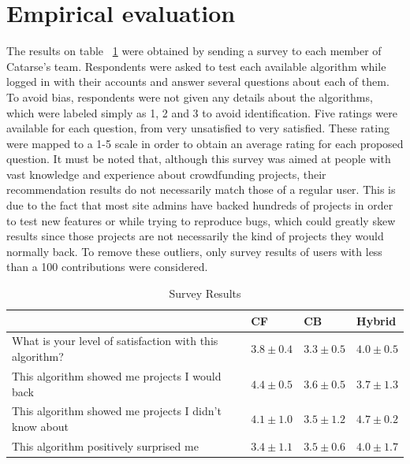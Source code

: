 \documentclass[cic,tc,english]{iiufrgs}
\begin{document}
\section{Empirical evaluation} \label{empirical-evaluation}
The results on table ~\ref{tbl:survey-results} were obtained by sending a survey to each member of Catarse's team. Respondents were asked to test each available algorithm while logged in with their accounts and answer several questions about each of them. To avoid bias, respondents were not given any details about the algorithms, which were labeled simply as 1, 2 and 3 to avoid identification. Five ratings were available for each question, from very unsatisfied to very satisfied. These rating were mapped to a 1-5 scale in order to obtain an average rating for each proposed question. It must be noted that, although this survey was aimed at people with vast knowledge and experience about crowdfunding projects, their recommendation results do not necessarily match those of a regular user. This is due to the fact that most site admins have backed hundreds of projects in order to test new features or while trying to reproduce bugs, which could greatly skew results since those projects are not necessarily the kind of projects they would normally back. To remove these outliers, only survey results of users with less than a 100 contributions were considered. 
\begin{table}[]
\centering
\caption{Survey Results}
\label{tbl:survey-results}
\begin{tabular}{llll}
\hline
\multicolumn{1}{|l|}{}                                                        & \multicolumn{1}{l|}{CF} & \multicolumn{1}{l|}{CB} & \multicolumn{1}{l|}{Hybrid} \\ \hline
\multicolumn{1}{|l|}{What is your level of satisfaction with this algorithm?} & \multicolumn{1}{l|}{$3.8\pm 0.4$}  & \multicolumn{1}{l|}{$3.3 \pm 0.5$}  & \multicolumn{1}{l|}{$4.0 \pm 0.5$}      \\ \hline
\multicolumn{1}{|l|}{This algorithm showed me projects I would back}          & \multicolumn{1}{l|}{$4.4 \pm 0.5$}  & \multicolumn{1}{l|}{$3.6 \pm 0.5$}  & \multicolumn{1}{l|}{$3.7 \pm 1.3$}      \\ \hline
\multicolumn{1}{|l|}{This algorithm showed me projects I didn't know about}   & \multicolumn{1}{l|}{$4.1 \pm 1.0$}  & \multicolumn{1}{l|}{$3.5 \pm 1.2$}  & \multicolumn{1}{l|}{$4.7 \pm 0.2$}      \\ \hline
\multicolumn{1}{|l|}{This algorithm positively surprised me}   & \multicolumn{1}{l|}{$3.4 \pm 1.1$}  & \multicolumn{1}{l|}{$3.5 \pm 0.6$}  & \multicolumn{1}{l|}{$4.0 \pm 1.7$}      \\ \hline
\end{tabular}
\end{table}
\end{document}
